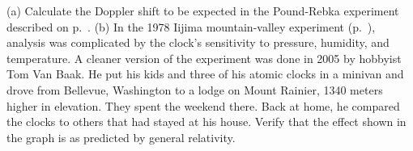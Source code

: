 (a) Calculate the Doppler shift to be expected in the Pound-Rebka experiment described on p.~\pageref{pound-rebka}.
(b) In the 1978 Iijima mountain-valley experiment (p.~\pageref{iijima}), analysis was complicated by the
clock's sensitivity to pressure, humidity, and temperature. A cleaner version of the experiment was done in
2005 by hobbyist Tom Van Baak. He put his 
kids and three of his atomic clocks in a minivan and drove from Bellevue, Washington to
a lodge on Mount Rainier, 1340 meters higher in elevation. They
spent the weekend there. Back at home, he compared the clocks
to others that had stayed at his house. 
Verify that the effect shown in the graph is as predicted by general relativity.
